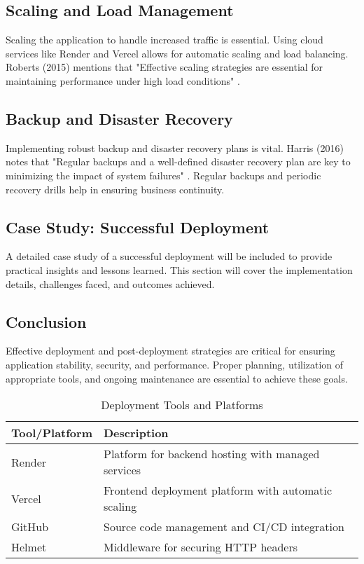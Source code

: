 \subsection{Scaling and Load Management}
Scaling the application to handle increased traffic is essential. Using cloud services like Render and Vercel allows for automatic scaling and load balancing. Roberts (2015) mentions that "Effective scaling strategies are essential for maintaining performance under high load conditions" \cite{roberts2015scaling}.

\subsection{Backup and Disaster Recovery}
Implementing robust backup and disaster recovery plans is vital. Harris (2016) notes that "Regular backups and a well-defined disaster recovery plan are key to minimizing the impact of system failures" \cite{harris2016backup}. Regular backups and periodic recovery drills help in ensuring business continuity.

\subsection{Case Study: Successful Deployment}
A detailed case study of a successful deployment will be included to provide practical insights and lessons learned. This section will cover the implementation details, challenges faced, and outcomes achieved.

\subsection{Conclusion}
Effective deployment and post-deployment strategies are critical for ensuring application stability, security, and performance. Proper planning, utilization of appropriate tools, and ongoing maintenance are essential to achieve these goals.


\begin{table}[h]
    \centering
    \begin{tabular}{|l|l|}
        \hline
        \textbf{Tool/Platform} & \textbf{Description} \\
        \hline
        Render & Platform for backend hosting with managed services \\
        Vercel & Frontend deployment platform with automatic scaling \\
        GitHub & Source code management and CI/CD integration \\
        Helmet & Middleware for securing HTTP headers \\
        \hline
    \end{tabular}
    \caption{Deployment Tools and Platforms}
    \label{tab:deployment_tools}
\end{table}